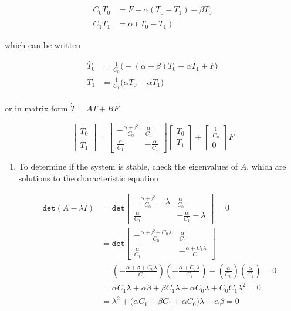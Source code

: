 \documentclass[11pt]{article}
\theoremstyle{definition}
\begin{document}
\begin{enumerate}
    \begin{align*}
        C_0 \dot{T_0} &= F - \alpha(T_0 - T_1) - \beta T_0 \\
        C_1 \dot{T_1} &= \alpha(T_0 - T_1)
    \end{align*}

    which can be written

    \begin{align*}
        \dot{T_0} &= \frac{1}{C_0} \big( -(\alpha + \beta) T_0 + \alpha T_1 + F \big) \\
        \dot{T_1} &= \frac{1}{C_1} \big( \alpha T_0 - \alpha T_1 \big) \\
    \end{align*}

    or in matrix form $\dot{T} = A T + B F$

    $$ \begin{bmatrix} \dot{T_0} \\ \dot{T_1} \end{bmatrix} = \begin{bmatrix} -\frac{\alpha + \beta}{C_0} & \frac{\alpha}{C_0} \\ \frac{\alpha}{C_1} & - \frac{\alpha}{C_1} \end{bmatrix} \begin{bmatrix} T_0 \\ T_1\end{bmatrix} + \begin{bmatrix} \frac{1}{C_0} \\ 0 \end{bmatrix} F $$

    \begin{enumerate}
        \item %
        To determine if the system is stable, check the eigenvalues of $A$, which are solutions to the characteristic equation

        \begin{align*}
            \mathtt{det} (A - \lambda I) &= \mathtt{det}\begin{bmatrix} -\frac{\alpha + \beta}{C_0} - \lambda & \frac{\alpha}{C_0} \\ \frac{\alpha}{C_1} & - \frac{\alpha}{C_1} - \lambda \end{bmatrix} = 0 \\
            &= \mathtt{det}\begin{bmatrix} -\frac{\alpha + \beta + C_0 \lambda}{C_0} & \frac{\alpha}{C_0} \\ \frac{\alpha}{C_1} & - \frac{\alpha + C_1\lambda}{C_1} \end{bmatrix} \\
            &= \left( -\frac{\alpha + \beta + C_0 \lambda}{C_0} \right) \left( - \frac{\alpha + C_1\lambda}{C_1} \right) - \left( \frac{\alpha}{C_0} \right)  \left( \frac{\alpha}{C_1}  \right) = 0\\
            &= \alpha C_1 \lambda + \alpha\beta + \beta C_1 \lambda + \alpha C_0 \lambda + C_0 C_1 \lambda^2 = 0 \\
            &= \lambda^2 + \big( \alpha C_1 + \beta C_1 + \alpha C_0 \big) \lambda + \alpha\beta = 0
        \end{align*}


\end{enumerate}
\end{enumerate}
\end{document}
